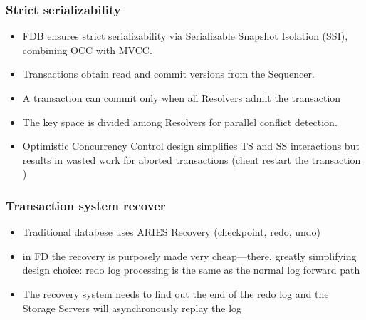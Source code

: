 \begin{frame}
	\frametitle{Strict serializability}
\begin{itemize}
  \item FDB ensures strict serializability via Serializable Snapshot Isolation (SSI), combining OCC with MVCC.
  \item Transactions obtain read and commit versions from the Sequencer.
  \item A transaction can commit only when all Resolvers admit the transaction
  \item The key space is divided among Resolvers for parallel conflict detection.
  \item Optimistic Concurrency Control design simplifies TS and SS interactions but results in wasted work for aborted transactions (client restart the transaction )
\end{itemize}

 \end{frame}







\begin{frame}
	\frametitle{Transaction system recover}
    \begin{itemize}
    
        \item Traditional databese uses ARIES Recovery (checkpoint, redo, undo)
        \item in FD the recovery is purposely made very cheap—there, greatly simplifying design choice: redo log processing is the same as the normal log forward path
        \item The recovery system needs to find out the end of the redo log and the Storage Servers will asynchronously replay the log
        
\end{itemize}
\end{frame}

